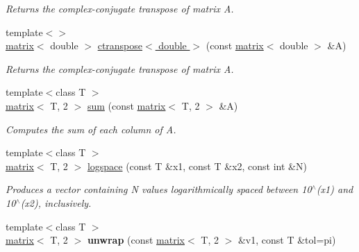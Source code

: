 \begin{DoxyCompactItemize}
\begin{DoxyCompactList}\small\item\em Returns the complex-\/conjugate transpose of matrix A. \end{DoxyCompactList}\item 
\hypertarget{namespacekeycpp_a9fc1e2c9bf6ee79ee28a6f25b7b55b23}{{\footnotesize template$<$$>$ }\\\hyperlink{classkeycpp_1_1matrix}{matrix}$<$ double $>$ \hyperlink{namespacekeycpp_a9fc1e2c9bf6ee79ee28a6f25b7b55b23}{ctranspose$<$ double $>$} (const \hyperlink{classkeycpp_1_1matrix}{matrix}$<$ double $>$ \&A)}\label{namespacekeycpp_a9fc1e2c9bf6ee79ee28a6f25b7b55b23}

\begin{DoxyCompactList}\small\item\em Returns the complex-\/conjugate transpose of matrix A. \end{DoxyCompactList}\item 
\hypertarget{namespacekeycpp_a36cda317c047e8579e665abccf1b1398}{{\footnotesize template$<$class T $>$ }\\\hyperlink{classkeycpp_1_1matrix}{matrix}$<$ T, 2 $>$ \hyperlink{namespacekeycpp_a36cda317c047e8579e665abccf1b1398}{sum} (const \hyperlink{classkeycpp_1_1matrix}{matrix}$<$ T, 2 $>$ \&A)}\label{namespacekeycpp_a36cda317c047e8579e665abccf1b1398}

\begin{DoxyCompactList}\small\item\em Computes the sum of each column of A. \end{DoxyCompactList}\item 
{\footnotesize template$<$class T $>$ }\\\hyperlink{classkeycpp_1_1matrix}{matrix}$<$ T, 2 $>$ \hyperlink{namespacekeycpp_a28626d0ffc4ecda3f9bc6e7b0f4fc4d2}{logspace} (const T \&x1, const T \&x2, const int \&N)
\begin{DoxyCompactList}\small\item\em Produces a vector containing N values logarithmically spaced between 10$^\wedge$(x1) and 10$^\wedge$(x2), inclusively. \end{DoxyCompactList}\item 
\hypertarget{namespacekeycpp_aec240358cae3ca4a4a92c9e7dead409c}{{\footnotesize template$<$class T $>$ }\\\hyperlink{classkeycpp_1_1matrix}{matrix}$<$ T, 2 $>$ {\bfseries unwrap} (const \hyperlink{classkeycpp_1_1matrix}{matrix}$<$ T, 2 $>$ \&v1, const T \&tol=pi)}\label{namespacekeycpp_aec240358cae3ca4a4a92c9e7dead409c}


\end{DoxyCompactItemize}
